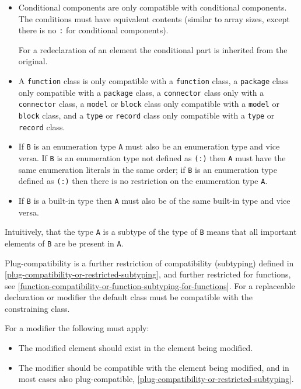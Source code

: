 \begin{itemize}
\begin{itemize}
  \item
    Conditional components are only compatible with conditional components.  The conditions must have equivalent contents (similar to array sizes, except there is no \lstinline!:! for conditional
    components).
    \begin{nonnormative}
    For a redeclaration of an element the conditional part is inherited from the original.
    \end{nonnormative}
  \item
    A \lstinline!function! class is only compatible with a \lstinline!function! class, a \lstinline!package! class only compatible with a \lstinline!package! class, a \lstinline!connector! class only with a \lstinline!connector! class, a \lstinline!model! or \lstinline!block! class only compatible with a \lstinline!model! or \lstinline!block! class, and a \lstinline!type! or \lstinline!record! class only compatible with a \lstinline!type! or \lstinline!record! class.
  \item
    If \lstinline!B! is an enumeration type \lstinline!A! must also be an enumeration type and
    vice versa. If \lstinline!B! is an enumeration type not defined as \lstinline!(:)! then \lstinline!A!
    must have the same enumeration literals in the same order; if \lstinline!B! is
    an enumeration type defined as \lstinline!(:)! then there is no restriction on
    the enumeration type \lstinline!A!.
  \item
    If \lstinline!B! is a built-in type then \lstinline!A! must also be of the same built-in
    type and vice versa.
  \end{itemize}
\end{itemize}

\begin{nonnormative}
Intuitively, that the type \lstinline!A! is a subtype of the type of \lstinline!B! means that all important elements of \lstinline!B! are be present in \lstinline!A!.
\end{nonnormative}

Plug-compatibility is a further restriction of compatibility (subtyping)
defined in \cref{plug-compatibility-or-restricted-subtyping}, and further restricted for functions, see
\cref{function-compatibility-or-function-subtyping-for-functions}. For a replaceable declaration or modifier the default class
must be compatible with the constraining class.

For a modifier the following must apply:
\begin{itemize}
\item
  The modified element should exist in the element being modified.
\item
  The modifier should be compatible with the element being modified, and
  in most cases also plug-compatible, \cref{plug-compatibility-or-restricted-subtyping}.
\end{itemize}

